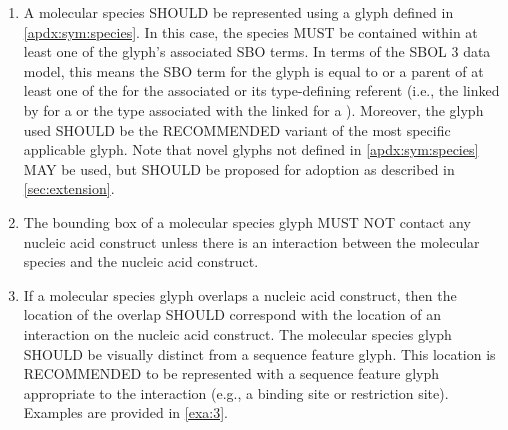 \begin{enumerate}
\item A molecular species SHOULD be represented using a glyph defined in \ref{apdx:sym:species}.  In this case, the species MUST be contained within at least one of the glyph's associated SBO terms.
In terms of the SBOL 3 data model, this means the SBO term for the glyph is equal to or a parent of at least one of the  for the associated  or its type-defining referent (i.e., the  linked by  for a  or the type associated with the linked  for a ).
	Moreover, the glyph used SHOULD be the RECOMMENDED variant of the most specific applicable glyph.  Note that novel glyphs not defined in \ref{apdx:sym:species} MAY be used, but SHOULD be proposed for adoption as described in \ref{sec:extension}.
	
\item The bounding box of a molecular species glyph MUST NOT contact any nucleic acid construct unless there is an interaction between the molecular species and the nucleic acid construct.  

\item If a molecular species glyph overlaps a nucleic acid construct, then the location of the overlap SHOULD correspond with the location of an interaction on the nucleic acid construct.
	The molecular species glyph SHOULD be visually distinct from a sequence feature glyph.
	This location is RECOMMENDED to be represented with a sequence feature glyph appropriate to the interaction (e.g., a binding site or restriction site). 
	Examples are provided in \ref{exa:3}.


\end{enumerate}
